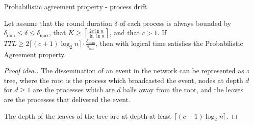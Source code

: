 
\begin{frame}{Probabilistic agreement property - process drift}
  
\begin{lemma}
Let assume that the round duration $\delta$ of each process is always bounded by $\delta_{\min} \leq \delta \leq \delta_{\max}$, that $K \geq \left\lceil\frac{2e\ln n}{\ln\ln n}\right\rceil$, and that $c>1$. If $TTL \geq 2 \lceil (c+1) \log_2 n \rceil \cdot \frac{\delta_{\max}}{\delta_{\min}}$, then \EPTO{} with logical time satisfies the Probabilistic Agreement property.
\end{lemma}

\begin{proof}[Proof idea.]
 The dissemination of an event in the network can be represented as a tree, where the root is the process which broadcasted the event, nodes at depth $d$ for $d \geq 1$ are the processes which are $d$ balls away from the root, and the leaves are the processes that delivered the event. \\ \medskip

The depth of the leaves of the tree are at depth at least $\lceil (c+1) \log_2 n \rceil$.
\end{proof}

\end{frame}


